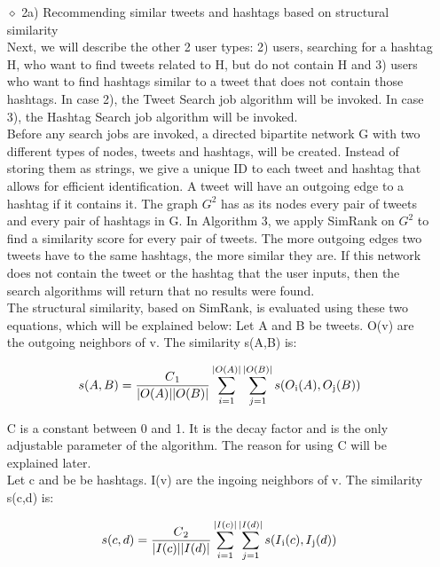 \documentclass[10pt]{article}
\begin{document}
\begin{itemize}
\begin{itemize}
\begin{itemize}
\end{itemize}


\item[$\diamond$]{2a) Recommending similar tweets and hashtags based on structural similarity}\\

Next, we will describe the other 2 user types: 2) users, searching for a hashtag H, who want to find tweets related to H, but do not contain H and 3) users who want to find hashtags similar to a tweet that does not contain those hashtags. In case 2), the Tweet Search job algorithm will be invoked. In case 3), the Hashtag Search job algorithm will be invoked. \\

Before any search jobs are invoked, a directed bipartite network G with two different types of nodes, tweets and hashtags, will be created. Instead of storing them as strings, we give a unique ID to each tweet and hashtag that allows for efficient identification. A tweet will have an outgoing edge to a hashtag if it contains it. The graph $ G^2$ has as its nodes every pair of tweets and every pair of hashtags in G. In Algorithm 3, we apply SimRank on $ G^2$  to find a similarity score for every pair of tweets. The more outgoing edges two tweets have to the same hashtags, the more similar they are. If this network does not contain the tweet or the hashtag that the user inputs, then the search algorithms will return that no results were found. \\

The structural similarity, based on SimRank, is evaluated using these two equations, which will be explained below:
Let A and B be tweets. O(v) are the outgoing neighbors of v. The similarity s(A,B) is:

$$s(A,B) = \dfrac{C\textsubscript{1}}{|O(A)||O(B)|} \sum_{i=1}^{|O(A)|} \sum_{j=1}^{|O(B)|} s(O\textsubscript{i}(A),O\textsubscript{j}(B))$$

C is a constant between 0 and 1. It is the decay factor and is the only adjustable parameter of the algorithm. The reason for using C will be explained later. \\

Let c and be be hashtags. I(v) are the ingoing neighbors of v.  The similarity s(c,d) is:

$$s(c,d) = \dfrac{C\textsubscript{2}}{|I(c)||I(d)|} \sum_{i=1}^{|I(c)|} \sum_{j=1}^{|I(d)|} s(I\textsubscript{i}(c),I\textsubscript{j}(d))$$


\end{itemize}
\end{itemize}
\end{document}
